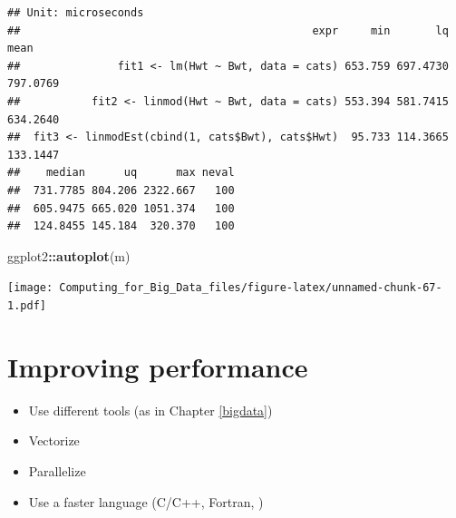 \documentclass[]{book}
\newenvironment{Shaded}{\begin{snugshade}}{\end{snugshade}}
\newcommand{\KeywordTok}[1]{\textcolor[rgb]{0.13,0.29,0.53}{\textbf{#1}}}
\newcommand{\DataTypeTok}[1]{\textcolor[rgb]{0.13,0.29,0.53}{#1}}
\newcommand{\DecValTok}[1]{\textcolor[rgb]{0.00,0.00,0.81}{#1}}
\newcommand{\StringTok}[1]{\textcolor[rgb]{0.31,0.60,0.02}{#1}}
\newcommand{\CommentTok}[1]{\textcolor[rgb]{0.56,0.35,0.01}{\textit{#1}}}
\newcommand{\OperatorTok}[1]{\textcolor[rgb]{0.81,0.36,0.00}{\textbf{#1}}}
\newcommand{\NormalTok}[1]{#1}
\theoremstyle{definition}
\theoremstyle{definition}
\theoremstyle{definition}
\theoremstyle{remark}
\begin{document}
\begin{Shaded}
\end{Shaded}

\begin{verbatim}
## Unit: microseconds
##                                             expr     min       lq     mean
##               fit1 <- lm(Hwt ~ Bwt, data = cats) 653.759 697.4730 797.0769
##           fit2 <- linmod(Hwt ~ Bwt, data = cats) 553.394 581.7415 634.2640
##  fit3 <- linmodEst(cbind(1, cats$Bwt), cats$Hwt)  95.733 114.3665 133.1447
##    median      uq      max neval
##  731.7785 804.206 2322.667   100
##  605.9475 665.020 1051.374   100
##  124.8455 145.184  320.370   100
\end{verbatim}

\begin{Shaded}
\begin{Highlighting}[]
\NormalTok{ggplot2}\OperatorTok{::}\KeywordTok{autoplot}\NormalTok{(m)}
\end{Highlighting}
\end{Shaded}

\texttt{[image: Computing\_for\_Big\_Data\_files/figure-latex/unnamed-chunk-67-1.pdf]}

\section{Improving performance}\label{improving-performance}

\begin{itemize}
\item
  Use different tools (as in Chapter \ref{bigdata})
\item
  Vectorize
\item
  Parallelize
\item
  Use a faster language (C/C++, Fortran, )
\end{itemize}
\end{document}

